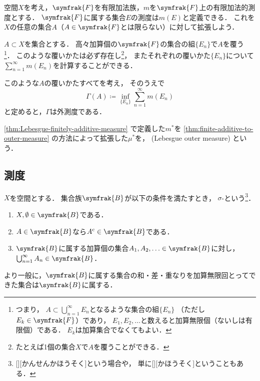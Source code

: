 \documentclass[../sotsu.tex]{subfiles}
\begin{document}
\begin{theorem}
    \label{thm:finite-additive-to-outer-measure}
    空間$X$を考え，$\symfrak{F}$を有限加法族，$m$を$\symfrak{F}$上の有限加法的測度とする．
    $\symfrak{F}$に属する集合$E$の測度は$m(E)$と定義できる．
    これを$X$の任意の集合$A$（$A \in \symfrak{F}$とは限らない）に対して拡張しよう．

    $A \subset X$を集合とする．
    高々加算個の$\symfrak{F}$の集合の組$\{ E_n \}$で$A$を覆う%
    \footnote{
        つまり，
        $\displaystyle A \subset \bigcup_{n=1}^{\infty} E_n$となるような集合の組$ \{ E_n \} $
        （ただし$E_k \in \symfrak{F}$）であり，
        $E_1, E_2, \dotsc$と数えると加算無限個（ないしは有限個）である．
        $E_k$は加算集合でなくてもよい．
    }．
    このような覆いかたは必ず存在し\footnote{たとえば1個の集合$X$で$A$を覆うことができる．}，
    またそれぞれの覆いかた$\{ E_n \}$について
    $\sum_{n=1}^{\infty} m(E_n)$を計算することができる．

    このような$A$の覆いかたすべてを考え，
    そのうえで
    \begin{equation*}
        \Gamma(A)  \coloneq  \inf_{ \{ E_n \} } \sum_{n=1}^{\infty} m(E_n)
    \end{equation*}
    と定めると，$\Gamma$は外測度である．
\end{theorem}


\begin{definition}
    \label{dfn:Lebesgue-outer-measure}
    \cref{thm:Lebesgue-finitely-additive-measure}%
    で定義した$m^*$を%
    \cref{thm:finite-additive-to-outer-measure}%
    の方法によって拡張した$\mu^*$を，
    (Lebesgue outer measure)%
    という．
\end{definition}



\subsection{測度}

\begin{definition}
    $X$を空間とする．
    集合族$\symfrak{B}$が以下の条件を満たすとき，
    $\sigma$-という\footnote{
        [][かんせんかほうそく]という場合や，
        単に[][かほうそく]ということもある．
    }．
    \begin{enumerate}
        \item $X, \emptyset \in \symfrak{B}$である．
        \item $A \in \symfrak{B}$なら$A^{\mathrm{c}} \in \symfrak{B}$である．
        \item $\symfrak{B}$に属する加算個の集合$A_1, A_2, \dotsc \in \symfrak{B}$に対し，
            \(  \bigcup_{n=1}^{\infty} A_n  \in  \symfrak{B}  \)．
    \end{enumerate}
    より一般に，$\symfrak{B}$に属する集合の和・差・重なりを加算無限回とってできた集合は$\symfrak{B}$に属する．
\end{definition}
\end{document}
